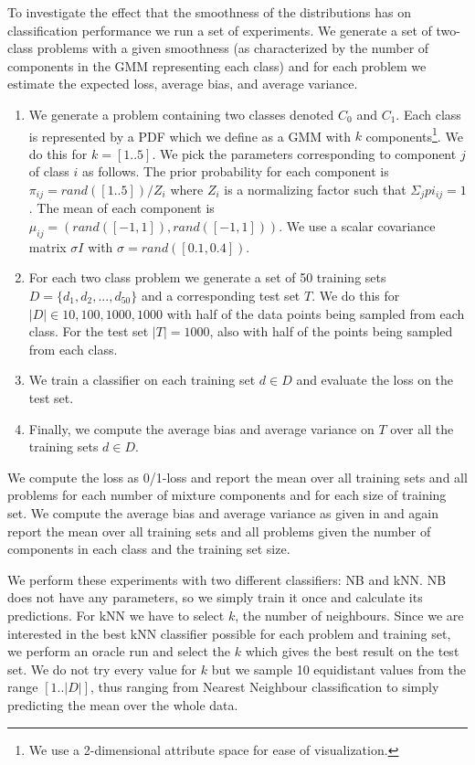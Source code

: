 \documentclass[a4paper]{article}
\begin{document}
To investigate the effect that the smoothness of the distributions has on classification performance we run a set of experiments. We generate a set of two-class problems with a given smoothness (as characterized by the number of components in the \ac{GMM} representing each class) and for each problem we estimate the expected loss, average bias, and average variance.

\begin{enumerate}
\item We generate a problem containing two classes denoted $C_0$ and $C_1$. Each class is represented by a \ac{PDF} which we define as a \ac{GMM} with $k$ components\footnote{We use a 2-dimensional attribute space for ease of visualization.}. We do this for $k = [1 .. 5]$. We pick the parameters corresponding to component $j$ of class $i$ as follows. The prior probability for each component is $\pi_{ij} = rand([1 .. 5]) / Z_i$ where $Z_i$ is a normalizing factor such that $\Sigma_{j} pi_{ij} = 1$. The mean of each component is $\mu_{ij} = (rand([-1,1]),rand([-1,1]))$. We use a scalar covariance matrix $\sigma I$ with $\sigma = rand([0.1,0.4])$.
\item For each two class problem we generate a set of 50 training sets $D = \{d_1, d_2, ..., d_{50}\}$ and a corresponding test set $T$. We do this for $|D| \in {10, 100, 1000, 1000}$ with half of the data points being sampled from each class. For the test set $|T| = 1000$, also with half of the points being sampled from each class.
\item We train a classifier on each training set $d \in D$ and evaluate the loss on the test set.
\item Finally, we compute the average bias and average variance on $T$ over all the training sets $d \in D$.
\end{enumerate}

We compute the loss as 0/1-loss and report the mean over all training sets and all problems for each number of mixture components and for each size of training set. We compute the average bias and average variance as given in \cite{Domingos2000} and again report the mean over all training sets and all problems given the number of components in each class and the training set size.

We perform these experiments with two different classifiers: \ac{NB} and \ac{kNN}. \ac{NB} does not have any parameters, so we simply train it once and calculate its predictions. For \ac{kNN} we have to select $k$, the number of neighbours. Since we are interested in the best \ac{kNN} classifier possible for each problem and training set, we perform an oracle run and select the $k$ which gives the best result on the test set. We do not try every value for $k$ but we sample 10 equidistant values from the range $[1 .. |D|]$, thus ranging from Nearest Neighbour classification to simply predicting the mean over the whole data.
\end{document}

